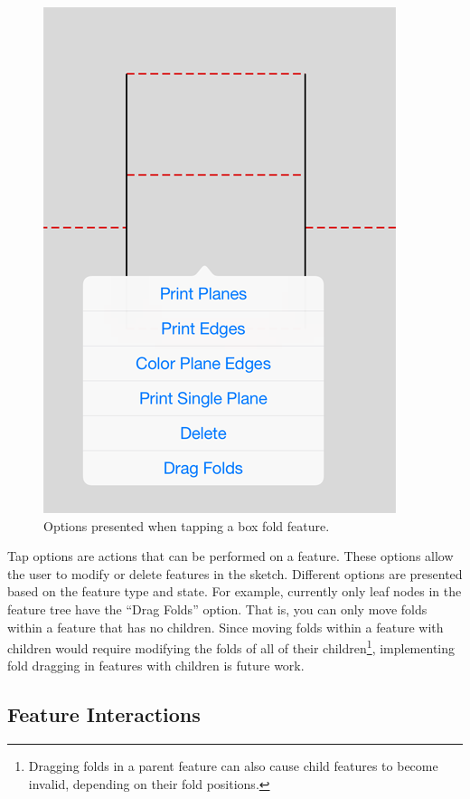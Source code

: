 \begin{figure}[htbp]
\centering
\includegraphics{figures/32_UI_Tool_Interactions/tap-options.png}
\caption{Options presented when tapping a box fold feature.}
\end{figure}

Tap options are actions that can be performed on a feature. These
options allow the user to modify or delete features in the sketch.
Different options are presented based on the feature type and state. For
example, currently only leaf nodes in the feature tree have the ``Drag
Folds'' option. That is, you can only move folds within a feature that
has no children. Since moving folds within a feature with children would
require modifying the folds of all of their children\footnote{Dragging
  folds in a parent feature can also cause child features to become
  invalid, depending on their fold positions.}, implementing fold
dragging in features with children is future work.

\subsection{Feature Interactions}\label{feature-interactions}


